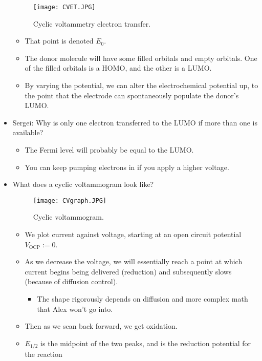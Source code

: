 \documentclass[../notes.tex]{subfiles}
\begin{document}
\begin{itemize}
    \begin{figure}[h!]
        \centering
        \texttt{[image: CVET.JPG]}
        \caption{Cyclic voltammetry electron transfer.}
        \label{fig:CVET}
    \end{figure}
    \begin{itemize}
        \item That point is denoted $E_0$.
        \item The donor molecule will have some filled orbitals and empty orbitals. One of the filled orbitals is a HOMO, and the other is a LUMO.
        \item By varying the potential, we can alter the electrochemical potential up, to the point that the electrode can spontaneously populate the donor's LUMO.
    \end{itemize}
    \item Sergei: Why is only one electron transferred to the LUMO if more than one is available?
    \begin{itemize}
        \item The Fermi level will probably be equal to the LUMO.
        \item You can keep pumping electrons in if you apply a higher voltage.
    \end{itemize}
    \pagebreak
    \item What does a cyclic voltammogram look like?
    \begin{figure}[h!]
        \centering
        \texttt{[image: CVgraph.JPG]}
        \caption{Cyclic voltammogram.}
        \label{fig:CVgraph}
    \end{figure}
    \begin{itemize}
        \item We plot current against voltage, starting at an open circuit potential $V_\text{OCP}:=0$.
        \item As we decrease the voltage, we will essentially reach a point at which current begins being delivered (reduction) and subsequently slows (because of diffusion control).
        \begin{itemize}
            \item The shape rigorously depends on diffusion and more complex math that Alex won't go into.
        \end{itemize}
        \item Then as we scan back forward, we get oxidation.
        \item $E_{1/2}$ is the midpoint of the two peaks, and is the reduction potential for the reaction

\end{itemize}
\end{itemize}
\end{document}
